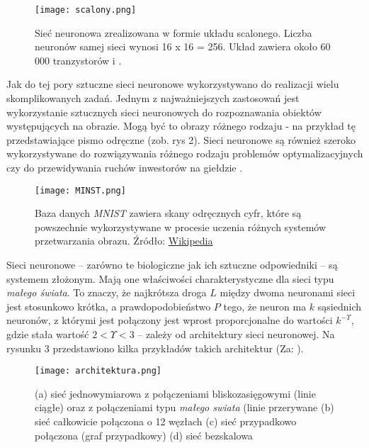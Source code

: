 \begin{figure}[H]
\begin{center}
\texttt{[image: scalony.png]}
\centering
\caption{Sieć neuronowa zrealizowana w formie układu scalonego. Liczba neuronów samej sieci wynosi 16 x 16 = 256. Układ zawiera około 60 000 tranzystorów \citep[s. 14]{Kosinski2017} i \citep{Chua1998}.}
\centering
\end{center}
\end{figure}

Jak do tej pory sztuczne sieci neuronowe wykorzystywano do realizacji wielu skomplikowanych zadań. Jednym z najważniejszych zastosowań jest wykorzystanie sztucznych sieci neuronowych do rozpoznawania obiektów występujących na obrazie. Mogą być to obrazy różnego rodzaju - na przykład tę przedstawiające pismo odręczne (zob. rys 2). Sieci neuronowe są również szeroko wykorzystywane do rozwiązywania różnego rodzaju problemów optymalizacyjnych czy do przewidywania ruchów inwestorów na giełdzie \citep[s. 15]{Kosinski2017}.

\begin{figure}[H]
\begin{center}
\texttt{[image: MINST.png]}
\caption{Baza danych \textit{MNIST} zawiera skany odręcznych cyfr, które są powszechnie wykorzystywane w procesie uczenia różnych systemów przetwarzania obrazu. Źródło: \href{https://en.wikipedia.org/wiki/MNIST_database}{Wikipedia}}
\centering
\end{center}
\end{figure}

Sieci neuronowe -- zarówno te biologiczne jak ich sztuczne odpowiedniki -- są systemem złożonym. Mają one właściwości charakterystyczne dla sieci typu \textit{małego świata}. To znaczy, że najkrótsza droga $L$ między dwoma neuronami sieci jest stosunkowo krótka, a prawdopodobieństwo $P$ tego, że neuron ma $k$ sąsiednich neuronów, z którymi jest połączony jest wprost proporcjonalne do wartości $k^{-\Upsilon}$, gdzie stała wartość $2 < \Upsilon < 3$ -- zależy od architektury sieci neuronowej. Na rysunku 3 przedstawiono kilka przykładów takich architektur (Za: \citep[s. 15-16]{Kosinski2017}).

\begin{figure}[H]
\texttt{[image: architektura.png]}
\centering
\caption{(a) sieć jednowymiarowa z połączeniami bliskozasięgowymi (linie ciągłe) oraz z połączeniami typu \textit{małego swiata} (linie przerywane (b) sieć całkowicie połączona o 12 węzłach (c) sieć przypadkowo połączona (graf przypadkowy) (d) sieć bezskalowa\protect\footnotemark}
\centering
\end{figure}

